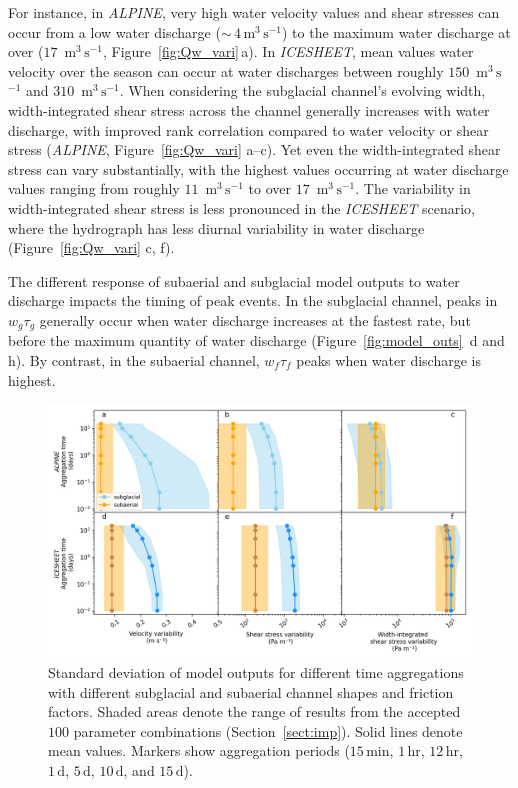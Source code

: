 \documentclass[draft]{agujournal2019}
\newcommand{\alpine}{\textit{ALPINE}}
\newcommand{\icesheet}{\textit{ICESHEET}}
\newcommand{\unit}[1]{$\mathrm{#1}$}
\begin{document}
For instance, in \alpine{}, very high water velocity values and shear stresses can occur from a low water discharge  ($\sim\,4$\,\unit{m}$^3$\,\unit{s}$^{-1}$) to the maximum water discharge at over ($17$ \,\unit{m}$^3$\,\unit{s}$^{-1}$, Figure~\ref{fig:Qw_vari}\,a).
In \icesheet{}, mean values water velocity over the season can occur at water discharges between roughly $150$ \,\unit{m}$^3$\,\unit{s}$^{-1}$ and $310$ \,\unit{m}$^3$\,\unit{s}$^{-1}$.
When considering the subglacial channel's evolving width, width-integrated shear stress  across the channel generally increases with water discharge, with improved rank correlation compared to water velocity or shear stress (\alpine{}, Figure~\ref{fig:Qw_vari} a--c).
Yet even the width-integrated shear stress  can vary substantially, with the highest values occurring at water discharge values ranging from roughly $11$ \,\unit{m}$^3$\,\unit{s}$^{-1}$ to over $17$ \,\unit{m}$^3$\,\unit{s}$^{-1}$.
The variability in width-integrated shear stress is less pronounced in the \icesheet{} scenario, where the hydrograph has less diurnal variability in water discharge (Figure~\ref{fig:Qw_vari} c, f).

The different response of subaerial and subglacial model outputs to water discharge impacts the timing of peak events.
In the subglacial channel, peaks in $w_g\tau_g$ generally occur when water discharge increases at the fastest rate, but before the maximum quantity of water discharge (Figure~\ref{fig:model_outs}\, d and h).
By contrast, in the subaerial channel,   $w_f\tau_f$  peaks when water discharge is highest.

\begin{figure}[h]
  \centering
    \includegraphics[width=0.9\linewidth]{Fig4.png}
    \caption{Standard deviation of model outputs for different time aggregations with different subglacial and subaerial channel shapes and friction factors.
      Shaded areas denote the range of results from the accepted $100$ parameter combinations (Section~\ref{sect:imp}).
      Solid lines denote  mean values.
      Markers show aggregation periods ($15$\,\unit{min}, $1$\,\unit{hr}, $12$\,\unit{hr}, $1$\,\unit{d}, $5$\,\unit{d}, $10$\,\unit{d}, and $15$\,\unit{d}).
       }
    \label{fig:multi_run}
  \end{figure}
\end{document}
